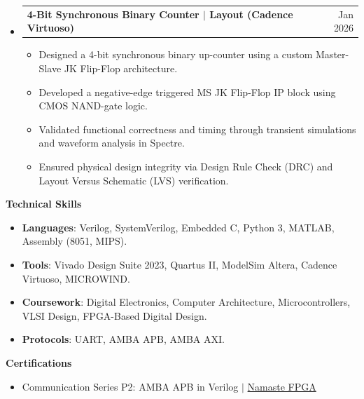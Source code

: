 \documentclass[letterpaper,11pt]{article}
\makeatletter
\newcommand{\resumeItem}[1]{\item\small{#1}}
\newcommand{\resumeProjectHeading}[2]{
\item
\begin{tabular*}{0.97\textwidth}{l@{\extracolsep{\fill}}r}
\small\textbf{#1} & \small #2 \\
\end{tabular*}
}
\newcommand{\resheading}[1]{%
\vspace{6pt}
\noindent
\colorbox{mygrey}{%
  \parbox{\dimexpr\linewidth-2\fboxsep}{%
    \textbf{#1}
  }%
}
\par\vspace{4pt}
}
\makeatother
\begin{document}
\begin{itemize}
\resumeProjectHeading
{4-Bit Synchronous Binary Counter $|$ Layout (Cadence Virtuoso)}
{Jan 2026}
\begin{itemize}
\resumeItem{Designed a 4-bit synchronous binary up-counter using a custom Master-Slave JK Flip-Flop architecture.}
\resumeItem{Developed a negative-edge triggered MS JK Flip-Flop IP block using CMOS NAND-gate logic.}
\resumeItem{Validated functional correctness and timing through transient simulations and waveform analysis in Spectre.}
\resumeItem{Ensured physical design integrity via Design Rule Check (DRC) and Layout Versus Schematic (LVS) verification.}
\end{itemize}

\end{itemize}

\resheading{Technical Skills}
\begin{itemize}

\item \small{\textbf{Languages}: Verilog, SystemVerilog, Embedded C, Python 3, MATLAB, Assembly (8051, MIPS).}

\item \small{\textbf{Tools}: Vivado Design Suite 2023, Quartus II, ModelSim Altera, Cadence Virtuoso, MICROWIND.}

\item \small{\textbf{Coursework}: Digital Electronics, Computer Architecture, Microcontrollers, VLSI Design, FPGA-Based Digital Design.}

\item \small{\textbf{Protocols}: UART, AMBA APB, AMBA AXI.}

\end{itemize}

\resheading{Certifications}
\begin{itemize}
\item \small{
Communication Series P2: AMBA APB in Verilog $|$ \href{https://drive.google.com/file/d/1oX3AQBMLTnz7NhxwLllbTi_hnUu9lKzz/view}{Namaste FPGA}
}
\end{itemize}
\end{document}
